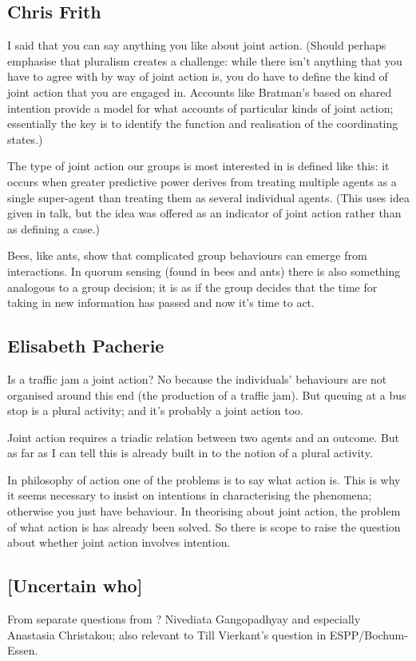 \documentclass[12pt,a4paper]{extarticle}
\begin{document}
\subsection{Chris Frith}
I said that you can say anything you like about joint action.  (Should perhaps emphasise that pluralism creates a challenge: while there isn't anything that you have to agree with by way of joint action is, you do have to define the kind of joint action that you are engaged in.  Accounts like Bratman's based on shared intention provide a model for what accounts of particular kinds of joint action; essentially the key is to identify the function and realisation of the coordinating states.)  

The type of joint action our groups is most interested in is defined like this: it occurs when greater predictive power derives from treating multiple agents as a single super-agent than treating them as several individual agents.  (This uses idea given in talk, but the idea was offered as an indicator of joint action rather than as defining a case.)

Bees, like ants, show that complicated group behaviours can emerge from interactions.  In quorum sensing (found in bees and ants) there is also something analogous to a group decision; it is as if the group decides that the time for taking in new information has passed and now it's time to act.  

\subsection{Elisabeth Pacherie}
Is a traffic jam a joint action?  No because the individuals' behaviours are not organised around this end (the production of a traffic jam).  But queuing at a bus stop is a plural activity; and it's probably a joint action too.

Joint action requires a triadic relation between two agents and an outcome.  But as far as I can tell this is already built in to the notion of a plural activity.

In philosophy of action one of the problems is to say what action is.  This is why it seems necessary to insist on intentions in characterising the phenomena; otherwise you just have behaviour.  In theorising about joint action, the problem of what action is has already been solved.  So there is scope to raise the question about whether joint action involves intention.


\subsection{[Uncertain who]}
From separate questions from ?  Nivediata Gangopadhyay and especially Anastasia Christakou; also relevant to Till Vierkant's question in ESPP/Bochum-Essen.
\end{document}
